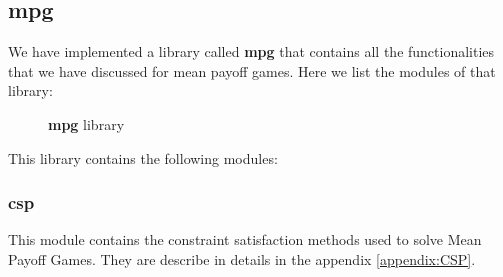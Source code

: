 \subsection{mpg}
We have implemented a library called \textbf{mpg} that contains all the functionalities that we have discussed for mean payoff games.
\newline Here we list the modules of that library:
\begin{figure}[H]
	\centering
	\caption{\textbf{mpg} library}
\end{figure}
\FloatBarrier
This library contains the following modules:
\subsubsection{csp}
This module contains the constraint satisfaction methods used to solve Mean Payoff Games. 
\newline They are describe in details in the appendix \ref{appendix:CSP}.
